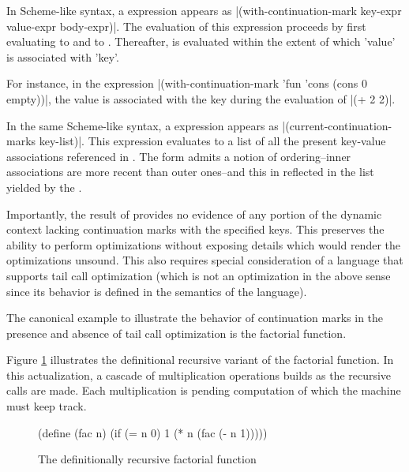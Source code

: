 In Scheme-like syntax, a  expression appears as
\scheme|(with-continuation-mark key-expr value-expr body-expr)|. The evaluation of this
expression proceeds by first evaluating  to  and
 to . Thereafter,  is evaluated within
the extent of which \scheme'value' is associated with \scheme 'key'.

For instance, in the expression \scheme|(with-continuation-mark 'fun 'cons (cons 0
empty))|, the value  is associated with the key  during the
evaluation of \scheme|(+ 2 2)|.

In the same Scheme-like syntax, a  expression appears
as \scheme|(current-continuation-marks key-list)|. This expression evaluates to a list of
all the present key-value associations referenced in . The
 form admits a notion of ordering--inner associations are
more recent than outer ones--and this in reflected in the list yielded by the
.

Importantly, the result of  provides no evidence of any
portion of the dynamic context lacking continuation marks with the specified keys. This
preserves the ability to perform optimizations without exposing details which would render
the optimizations unsound. This also requires special consideration of a language that
supports tail call optimization (which is not an optimization in the above sense since its
behavior is defined in the semantics of the language).

The canonical example to illustrate the behavior of continuation marks in the presence and
absence of tail call optimization is the factorial function.

Figure \ref{fac-rec} illustrates the definitional recursive variant of the factorial
function. In this actualization, a cascade of multiplication operations builds as the
recursive calls are made. Each multiplication is pending computation of which the machine 
must keep track.

\begin{figure}
\begin{schemeblock}
(define (fac n)
  (if (= n 0)
      1
      (* n (fac (- n 1)))))
\end{schemeblock}
\caption{The definitionally recursive factorial function}
\label{fac-rec}
\end{figure}


